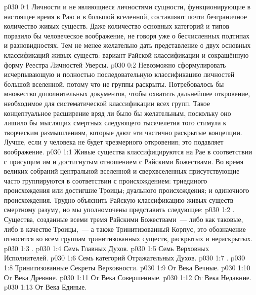 \author{Могущественный Посланник}
\vs p030 0:1 Личности и не являющиеся личностями сущности, функционирующие в настоящее время в Раю и в большой вселенной, составляют почти безграничное количество живых существ. Даже количество основных категорий и типов поразило бы человеческое воображение, не говоря уже о бесчисленных подтипах и разновидностях. Тем не менее желательно дать представление о двух основных классификаций живых существ: вариант Райской классификации и сокращённую форму Реестра Личностей Уверсы.
\vs p030 0:2 Невозможно сформулировать исчерпывающую и полностью последовательную классификацию личностей большой вселенной, потому что не  группы раскрыты. Потребовалось бы множество дополнительных документов, чтобы охватить дальнейшее откровение, необходимое для систематической классификации всех групп. Такое концептуальное расширение вряд ли было бы желательным, поскольку оно лишило бы мыслящих смертных следующего тысячелетия того стимула к творческим размышлениям, которые дают эти частично раскрытые концепции. Лучше, если у человека не будет чрезмерного откровения; это подавляет воображение.
\vs p030 1:1 Живые существа классифицируются на Рае в соответствии с присущим им и достигнутым отношением с Райскими Божествами. Во время великих собраний центральной вселенной  и сверхвселенных присутствующие часто группируются в соответствии с происхождением: триединого происхождения или достигшие Троицы; дуального происхождения; и одиночного происхождения. Трудно объяснить Райскую классификацию живых существ смертному разуму, но мы уполномочены представить следующее:
\vs p030 1:2 . Существа, созданные всеми тремя Райскими Божествами~--- либо как таковые, либо в качестве Троицы,~--- а также Тринитизованный Корпус, это обозначение относится ко всем группам тринитизованных существ, раскрытых и нераскрытых.
\vs p030 1:3 .
\vs p030 1:4 Семь Главных Духов.
\vs p030 1:5 Семь Верховных Исполнителей.
\vs p030 1:6 Семь категорий Отражательных Духов.
\vs p030 1:7 .
\vs p030 1:8 Тринитизованные Секреты Верховности.
\vs p030 1:9 От Века Вечные.
\vs p030 1:10 От Века Древние.
\vs p030 1:11 От Века Совершенные.
\vs p030 1:12 От Века Недавние.
\vs p030 1:13 От Века Единые.
